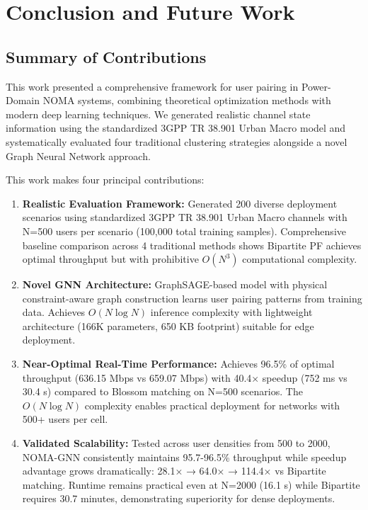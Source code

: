 \section{Conclusion and Future Work}

\subsection{Summary of Contributions}

This work presented a comprehensive framework for user pairing in Power-Domain NOMA systems, combining theoretical optimization methods with modern deep learning techniques. We generated realistic channel state information using the standardized 3GPP TR 38.901 Urban Macro model and systematically evaluated four traditional clustering strategies alongside a novel Graph Neural Network approach.

This work makes four principal contributions:

\begin{enumerate}
    \item \textbf{Realistic Evaluation Framework:} Generated 200 diverse deployment scenarios using standardized 3GPP TR 38.901 Urban Macro channels with N=500 users per scenario (100,000 total training samples). Comprehensive baseline comparison across 4 traditional methods shows Bipartite PF achieves optimal throughput but with prohibitive $O(N^3)$ computational complexity.
    
    \item \textbf{Novel GNN Architecture:} GraphSAGE-based model with physical constraint-aware graph construction learns user pairing patterns from training data. Achieves $O(N \log N)$ inference complexity with lightweight architecture (166K parameters, 650 KB footprint) suitable for edge deployment.
    
    \item \textbf{Near-Optimal Real-Time Performance:} Achieves 96.5\% of optimal throughput (636.15 Mbps vs 659.07 Mbps) with 40.4× speedup (752 ms vs 30.4 s) compared to Blossom matching on N=500 scenarios. The $O(N \log N)$ complexity enables practical deployment for networks with 500+ users per cell.
    
    \item \textbf{Validated Scalability:} Tested across user densities from 500 to 2000, NOMA-GNN consistently maintains 95.7-96.5\% throughput while speedup advantage grows dramatically: 28.1× → 64.0× → 114.4× vs Bipartite matching. Runtime remains practical even at N=2000 (16.1 s) while Bipartite requires 30.7 minutes, demonstrating superiority for dense deployments.
\end{enumerate}

